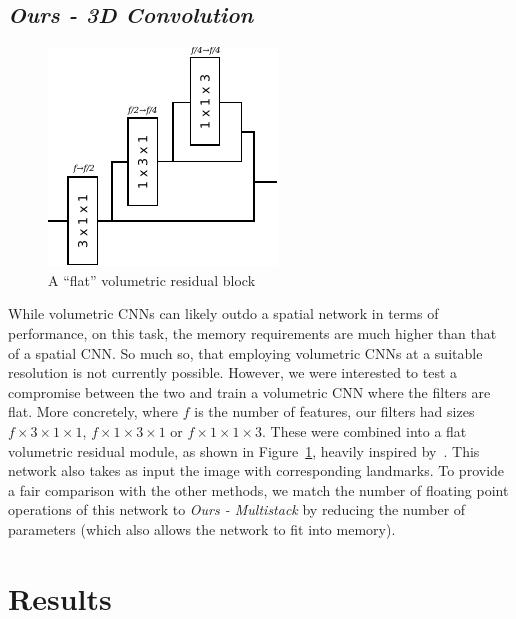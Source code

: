 \subsection{\textit{Ours - 3D Convolution}}

\begin{figure}
  \centering
  \includegraphics[width=0.3\linewidth]{img/volumetric_residual.pdf}
  \caption{A ``flat'' volumetric residual block}
  \label{fig:flat_vol_residual}
\end{figure}

While volumetric CNNs can likely outdo a spatial network in terms of
performance, on this task, the memory requirements are much higher
than that of a spatial CNN. So much so, that employing volumetric CNNs
at a suitable resolution is not currently possible. However, we were
interested to test a compromise between the two and train a volumetric
CNN where the filters are flat. More concretely, where $f$ is the
number of features, our filters had sizes $f\times 3\times 1\times 1$,
$f\times 1\times 3\times 1$ or $f\times 1\times 1\times 3$. These were
combined into a flat volumetric residual module, as shown in
Figure~\ref{fig:flat_vol_residual}, heavily inspired
by~\cite{qiu2017pseudo}. This network also takes as input the image
with corresponding landmarks. To provide a fair comparison with the
other methods, we match the number of floating point operations of
this network to \textit{Ours - Multistack} by reducing the number of
parameters (which also allows the network to fit into memory).



\section{Results}

